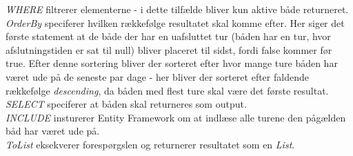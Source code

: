 \textit{WHERE} filtrerer elementerne - i dette tilfælde bliver kun aktive både returneret.\\

\textit{OrderBy} speciferer hvilken rækkefølge resultatet skal komme efter. Her siger det første statement at de både der har en uafsluttet tur (båden har en tur, hvor afslutningstiden er sat til null) bliver placeret til sidst, fordi false kommer før true. Efter denne sortering bliver der sorteret efter hvor mange ture båden har været ude på de seneste par dage - her bliver der sorteret efter faldende rækkefølge \textit{descending}, da båden med flest ture skal være det første resultat.\\

\textit{SELECT} speciferer at båden skal returneres som output.\\

\textit{INCLUDE} insturerer Entity Framework om at indlæse alle turene den pågælden båd har været ude på.\\

\textit{ToList} eksekverer forespørgslen og returnerer resultatet som en \textit{List}.